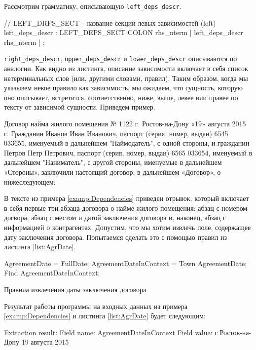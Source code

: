 Рассмотрим грамматику, описывающую \lstinline{left_deps_descr}.
\begin{Verb}
// LEFT_DRPS_SECT - название секции левых зависимостей (left)
left_deps_descr
    : LEFT_DEPS_SECT COLON rhs_nterm
    | left_deps_descr rhs_nterm
    | %
    ;
\end{Verb}
\lstinline{right_deps_descr}, \lstinline{upper_deps_descr} и \lstinline{lower_deps_descr} описываются по аналогии. Как видно из листинга, описание зависимости включает в себя список нетерминальных слов (или, другими словами, правил). Таким образом, когда мы указывем некое правило как зависимость, мы ожидаем, что сущность, которую оно описывает, встретится, соответственно, ниже, выше, левее или правее по тексту от зависимой сущности. Приведем пример.
\begin{myexample}
Договор найма жилого помещения № 1122\newline
г. Ростов-на-Дону «19» августа 2015 г.\newline
Гражданин Иванов Иван Иванович, паспорт (серия, номер, выдан) 6545 033655, именуемый в дальнейшем "Наймодатель", с одной стороны, и гражданин Петров Петр Петрович, паспорт (серия, номер, выдан) 6565 033654, именуемый в дальнейшем "Наниматель", с другой стороны, именуемые в дальнейшем «Стороны», заключили настоящий договор, в дальнейшем «Договор», о нижеследующем: 
\label{examp:Dependencies}
\end{myexample}
В тексте из примера \ref{examp:Dependencies} приведен отрывок, который включает в себя первые три абзаца договора о найме жилого помещения: абзац с номером догвора, абзац с местом и датой заключения договора и, наконец, абзац с информацией о контрагентах. Допустим, что мы хотим извлечь поле, содержащее дату заключения договора. Попытаемся сделать это с помощью правил из листинга \ref{list:AgrDate}.
\begin{ListingEnv}
\begin{Verb}
AgreementDate = FullDate;
AgreementDateInContext = Town AgreementDate;
Find AgreementDateInContext;
\end{Verb}
\caption{Правила извлечения даты заключения договора}
\label{list:AgrDate}
\end{ListingEnv}
Результат работы программы на входных данных из примера \ref{examp:Dependencies} и листинга \ref{list:AgrDate} будет следующим:
\begin{Verb}
Extraction result:
Field name: AgreementDateInContext
Field value: г Ростов-на-Дону 19 августа 2015
\end{Verb}
